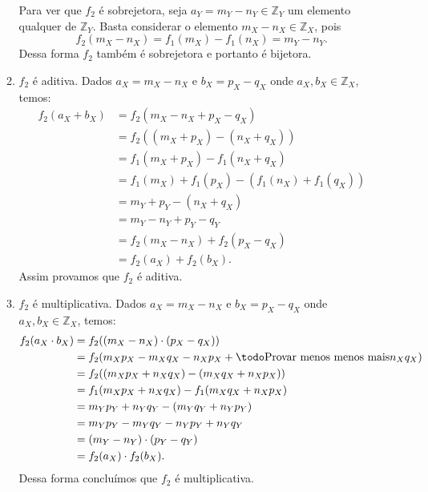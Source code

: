 \documentclass[../main.tex]{subfiles}
\begin{document}
\begin{dem}
\begin{enumerate}
\begin{enumerate}
            Para ver que $f_2$ é sobrejetora, seja $a_Y = m_Y - n_Y \in \mathbb{Z}_Y$ um elemento qualquer de $\mathbb{Z}_Y$. Basta considerar o elemento 
            $m_X - n_X \in \mathbb{Z}_X$, pois 
            \[ f_2(m_X - n_X) = f_1(m_X) - f_1(n_X) = m_Y - n_Y. \] 
            Dessa forma $f_2$ também é sobrejetora e portanto é bijetora.

            \item $f_2$ é aditiva. Dados $a_X = m_X - n_X$ e $b_X = p_X - q_X$ onde $a_X, b_X \in \mathbb{Z}_X$, temos:
            \begin{align*}
                f_2(a_X + b_X) &= f_2(m_X - n_X + p_X - q_X) \\
                &= f_2((m_X + p_X) - (n_X + q_X)) \\
                &= f_1(m_X + p_X) - f_1(n_X+q_X) \\
                &= f_1(m_X) + f_1(p_X) - (f_1(n_X) + f_1(q_X)) \\
                &= m_Y + p_Y - (n_X + q_X) \\
                &= m_Y - n_Y + p_Y - q_Y \\
                &= f_2(m_X - n_X) + f_2(p_X - q_X) \\
                &= f_2(a_X) + f_2(b_X).
            \end{align*}
            Assim provamos que $f_2$ é aditiva.

            \item $f_2$ é multiplicativa. Dados $a_X = m_X - n_X$ e $b_X = p_X - q_X$ onde $a_X, b_X \in \mathbb{Z}_X$, temos:
            \begin{align*}
                f_2(a_X \cdot b_X) 
                &= f_2( (m_X - n_X) \cdot (p_X - q_X) ) \\
                &= f_2( m_Xp_X - m_Xq_X - n_Xp_X + \todoAlign{Provar menos menos mais} n_Xq_X ) \\
                &= f_2( (m_Xp_X + n_Xq_X) - (m_Xq_X + n_Xp_X) ) \\
                &= f_1 (m_Xp_X + n_Xq_X) - f_1(m_Xq_X + n_Xp_X) \\
                &= m_Yp_Y + n_Yq_Y - (m_Yq_Y + n_Yp_Y) \\
                &= m_Yp_Y - m_Yq_Y - n_Yp_Y + n_Yq_Y \\
                &= (m_Y-n_Y) \cdot (p_Y-q_Y) \\
                &= f_2(a_X) \cdot f_2(b_X).
            \end{align*}
            Dessa forma concluímos que $f_2$ é multiplicativa.


\end{enumerate}
\end{enumerate}
\end{dem}
\end{document}
